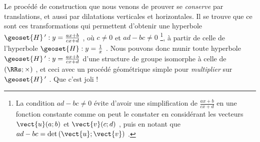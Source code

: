 Le procédé de construction que nous venons de prouver se \emph{\og conserve \fg} par translations, et aussi par dilatations verticales et horizontales.
Il se trouve que ce sont ces transformations qui permettent d'obtenir une hyperbole $\geoset{H}\,^\prime : y = \frac{a x + b}{c x + d}$ , où $c \neq 0$ et $ad - bc \neq 0$ 
\footnote{
	La condition $ad - bc \neq 0$ évite d'avoir une simplification de $\frac{a x + b}{c x + d}$ en une fonction constante comme on peut le constater en considérant les vecteurs $\vect{u}(a ; b)$ et $\vect{v}(c ; d)$ , puis en notant que $ad - bc = \det \left( \vect{u} ; \vect{v} \right)$ .  
},
à partir de celle de l'hyperbole $\geoset{H} : y = \frac{1}{x}$ .
Nous pouvons donc munir toute hyperbole $\geoset{H}\,^\prime : y = \frac{a x + b}{c x + d}$ d'une structure de groupe isomorphe à celle de $(\RRs ; \times)$ , et ceci avec un procédé géométrique simple pour \emph{\og multiplier \fg} sur $\geoset{H}\,^\prime$ . Que c'est joli !
